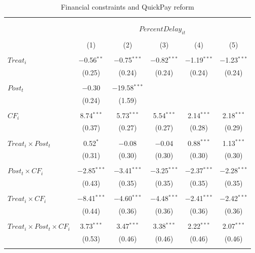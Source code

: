 \documentclass[
]{article}
\begin{document}
\begin{table}[H] \centering 
  \caption{Financial constraints and QuickPay reform} 
  \label{} 
\small 
\begin{tabular}{@{\extracolsep{-2pt}}lccccc} 
\\[-1.8ex]\hline 
\hline \\[-1.8ex] 
\\[-1.8ex] & \multicolumn{5}{c}{$PercentDelay_{it}$  } \\ 
\\[-1.8ex] & (1) & (2) & (3) & (4) & (5)\\ 
\hline \\[-1.8ex] 
 $Treat_i$ & $-$0.56$^{**}$ & $-$0.75$^{***}$ & $-$0.82$^{***}$ & $-$1.19$^{***}$ & $-$1.23$^{***}$ \\ 
  & (0.25) & (0.24) & (0.24) & (0.24) & (0.24) \\ 
  & & & & & \\ 
 $Post_t$ & $-$0.30 & $-$19.58$^{***}$ &  &  &  \\ 
  & (0.24) & (1.59) &  &  &  \\ 
  & & & & & \\ 
 $CF_i$ & 8.74$^{***}$ & 5.73$^{***}$ & 5.54$^{***}$ & 2.14$^{***}$ & 2.18$^{***}$ \\ 
  & (0.37) & (0.27) & (0.27) & (0.28) & (0.29) \\ 
  & & & & & \\ 
 $Treat_i \times Post_t$ & 0.52$^{*}$ & $-$0.08 & $-$0.04 & 0.88$^{***}$ & 1.13$^{***}$ \\ 
  & (0.31) & (0.30) & (0.30) & (0.30) & (0.30) \\ 
  & & & & & \\ 
 $Post_t \times CF_i$ & $-$2.85$^{***}$ & $-$3.41$^{***}$ & $-$3.25$^{***}$ & $-$2.37$^{***}$ & $-$2.28$^{***}$ \\ 
  & (0.43) & (0.35) & (0.35) & (0.35) & (0.35) \\ 
  & & & & & \\ 
 $Treat_i \times CF_i$ & $-$8.41$^{***}$ & $-$4.60$^{***}$ & $-$4.48$^{***}$ & $-$2.41$^{***}$ & $-$2.42$^{***}$ \\ 
  & (0.44) & (0.36) & (0.36) & (0.36) & (0.36) \\ 
  & & & & & \\ 
 $Treat_i \times Post_t \times CF_i$ & 3.73$^{***}$ & 3.47$^{***}$ & 3.38$^{***}$ & 2.22$^{***}$ & 2.07$^{***}$ \\ 
  & (0.53) & (0.46) & (0.46) & (0.46) & (0.46) \\ 
  & & & & & \\ 

\end{tabular}
\end{table}
\end{document}
